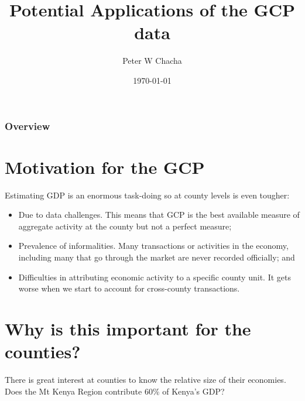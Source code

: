 \documentclass{beamer}
\title[Short title]{Potential Applications of the GCP data} %
\author{Peter W Chacha} %
\institute[The World Bank Group] %
{
The World Bank Group\\ %
\medskip
}
\date{\today} %
\begin{document}
\begin{frame}
\titlepage %
\end{frame}

\begin{frame}
\frametitle{Overview} %
\tableofcontents %
\end{frame}



\section{Motivation for the GCP}
\begin{frame}{Estimating GDP is an enormous task-doing so at county levels is even tougher:}
    \begin{itemize}
        \item Due to data challenges. This means that GCP is the best available measure of aggregate activity at the county but not a perfect measure;
        \item Prevalence of informalities. Many transactions or activities in the economy, including many that go through the market are never recorded officially; and 
        \item Difficulties in attributing economic activity to a specific county unit. It gets worse when we start to account for cross-county transactions.
    \end{itemize}
\end{frame}
\section{Why is this important for the counties?}
\begin{frame}{There is great interest at counties to know the relative size of their economies.}
    Does the Mt Kenya Region contribute 60\% of Kenya's GDP?
\end{frame}
\end{document}
